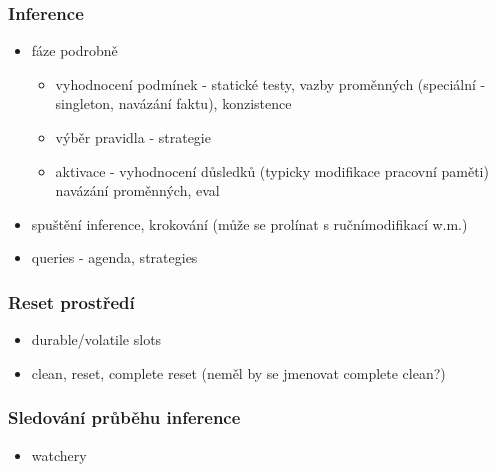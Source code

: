 \subsubsection{Inference}
\label{inference}
\begin{framed}
  \begin{itemize}
    \item fáze podrobně
    \begin{itemize}
      \item vyhodnocení podmínek - statické testy, vazby proměnných (speciální -
        singleton, navázání faktu), konzistence
      \item výběr pravidla - strategie
      \item aktivace - vyhodnocení důsledků (typicky modifikace pracovní paměti)
        navázání proměnných, eval
    \end{itemize}
    \item spuštění inference, krokování (může se prolínat s ručnímodifikací w.m.)
    \item queries - agenda, strategies
  \end{itemize}
\end{framed}

\subsubsection{Reset prostředí}
\begin{framed}
  \begin{itemize}
    \item durable/volatile slots
    \item clean, reset, complete reset (neměl by se jmenovat complete clean?)
  \end{itemize}
\end{framed}

\subsubsection{Sledování průběhu inference}
\label{inference tracing}
\begin{framed}
  \begin{itemize}
    \item watchery
  \end{itemize}
\end{framed}

